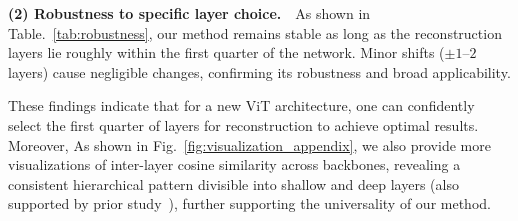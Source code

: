 \begin{minipage}[h]{0.335\textwidth}
    \centering
    \captionsetup{type=table}
    \caption{Robustness on layers.}
    \label{tab:robustness}
\end{minipage}

\textbf{(2) Robustness to specific layer choice.}~~As shown in Table.~\ref{tab:robustness}, our method remains stable as long as the reconstruction layers lie roughly within the first quarter of the network. Minor shifts (\(\pm1\)–\(2\) layers) cause negligible changes, confirming its robustness and broad applicability.

These findings indicate that for a new ViT architecture, one can confidently select the first quarter of layers for reconstruction to achieve optimal results.
Moreover, As shown in Fig.~\ref{fig:visualization_appendix}, we also provide more visualizations of inter-layer cosine similarity across backbones, revealing a consistent hierarchical pattern divisible into shallow and deep layers (also supported by prior study~\citep{chen2025rethinking}), further supporting the universality of our method.


